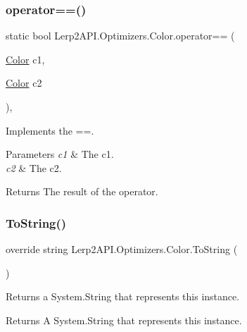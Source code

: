 \subsubsection{\texorpdfstring{operator==()}{operator==()}}
{\footnotesize\ttfamily static bool Lerp2\+A\+P\+I.\+Optimizers.\+Color.\+operator== (\begin{DoxyParamCaption}\item[{\hyperlink{struct_lerp2_a_p_i_1_1_optimizers_1_1_color}{Color}}]{c1,  }\item[{\hyperlink{struct_lerp2_a_p_i_1_1_optimizers_1_1_color}{Color}}]{c2 }\end{DoxyParamCaption})\hspace{0.3cm}{\ttfamily [inline]}, {\ttfamily [static]}}



Implements the ==. 


\begin{DoxyParams}{Parameters}
{\em c1} & The c1.\\
\hline
{\em c2} & The c2.\\
\hline
\end{DoxyParams}
\begin{DoxyReturn}{Returns}
The result of the operator.
\end{DoxyReturn}
\mbox{\label{struct_lerp2_a_p_i_1_1_optimizers_1_1_color_ad003a5f4b2d92f5d5f64b5047c315aa3}} 
\subsubsection{\texorpdfstring{To\+String()}{ToString()}}
{\footnotesize\ttfamily override string Lerp2\+A\+P\+I.\+Optimizers.\+Color.\+To\+String (\begin{DoxyParamCaption}{ }\end{DoxyParamCaption})\hspace{0.3cm}{\ttfamily [inline]}}



Returns a System.\+String that represents this instance. 

\begin{DoxyReturn}{Returns}
A System.\+String that represents this instance.
\end{DoxyReturn}



